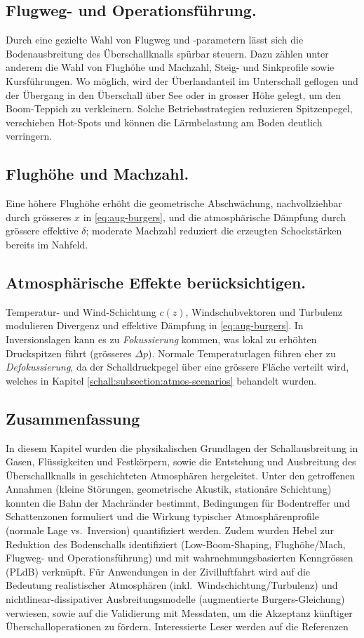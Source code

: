 \subsection*{Flugweg- und Operationsführung.}
Durch eine gezielte Wahl von Flugweg und -parametern lässt sich die
Bodenausbreitung des Überschallknalls spürbar steuern.
Dazu zählen unter anderem die Wahl von Flughöhe und Machzahl, Steig-
und Sinkprofile sowie Kursführungen.
Wo möglich, wird der Überlandanteil im Unterschall geflogen und der
Übergang in den Überschall über See oder in grosser Höhe gelegt,
um den Boom-Teppich zu verkleinern.
Solche Betriebsstrategien reduzieren Spitzenpegel, verschieben Hot-Spots
und können die Lärmbelastung am Boden deutlich verringern.

\subsection*{Flughöhe und Machzahl.}
Eine höhere Flughöhe erhöht die geometrische Abschwächung, nachvollziehbar durch
grösseres $x$ in \eqref{eq:aug-burgers}, und die atmosphärische Dämpfung durch
grössere effektive $\delta$; moderate Machzahl reduziert die erzeugten
Schockstärken bereits im Nahfeld.

\subsection*{Atmosphärische Effekte berücksichtigen.}
Temperatur- und Wind-Schichtung $c(z)$, Windschubvektoren und Turbulenz
modulieren Divergenz und effektive Dämpfung in \eqref{eq:aug-burgers}.
In Inversionslagen kann es zu \emph{Fokussierung} kommen, was lokal
zu erhöhten Druckspitzen führt (grösseres $\Delta p$).
Normale Temperaturlagen führen eher zu \emph{Defokussierung},
da der Schalldruckpegel über eine grössere Fläche verteilt wird,
welches in Kapitel \ref{schall:subsection:atmos-scenarios} behandelt wurden.

\subsection*{Zusammenfassung}
In diesem Kapitel wurden die physikalischen Grundlagen der
Schallausbreitung in Gasen, Flüssigkeiten und Festkörpern, sowie die
Entstehung und Ausbreitung des Überschallknalls in geschichteten
Atmosphären hergeleitet.
Unter den getroffenen Annahmen (kleine Störungen, geometrische Akustik,
stationäre Schichtung) konnten die Bahn der Machränder bestimmt,
Bedingungen für Bodentreffer und Schattenzonen formuliert und die Wirkung
typischer Atmosphärenprofile (normale Lage vs.\ Inversion) quantifiziert werden.
Zudem wurden Hebel zur Reduktion des Bodenschalls identifiziert
(Low-Boom-Shaping, Flughöhe/Mach, Flugweg- und Operationsführung) und mit
wahrnehmungsbasierten Kenngrössen (PLdB) verknüpft.
Für Anwendungen in der Zivilluftfahrt wird auf die Bedeutung
realistischer Atmosphären (inkl.\ Windschichtung/Turbulenz) und
nichtlinear-dissipativer Ausbreitungsmodelle
(augmentierte Burgers-Gleichung) verwiesen,
sowie auf die Validierung mit Messdaten, um die Akzeptanz künftiger
Überschalloperationen zu fördern. Interessierte Leser werden auf die
Referenzen